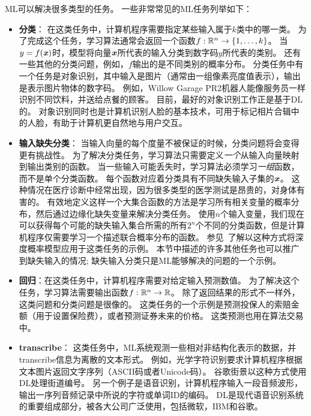 \gls{ML}可以解决很多类型的任务。
一些非常常见的\gls{ML}任务列举如下：
\begin{itemize}
    \item \textbf{分类}：
    在这类任务中，计算机程序需要指定某些输入属于$k$类中的哪一类。
    为了完成这个任务，学习算法通常会返回一个函数$f:\mathbb{R}^n \to \{1,\dots,k\}$。
    当$y=f(\boldsymbol{\mathit{x}})$时，模型将向量$\boldsymbol{\mathit{x}}$所代表的输入分类到数字码$y$所代表的类别。
    还有一些其他的分类问题，例如，$f$输出的是不同类别的概率分布。
    分类任务中有一个任务是对象识别，其中输入是图片（通常由一组像素亮度值表示），输出是表示图片物体的数字码。
    例如，Willow Garage PR2机器人能像服务员一样识别不同饮料，并送给点餐的顾客\citep{Goodfellow2010}。
    目前，最好的对象识别工作正是基于\gls{DL}的\citep{Krizhevsky-2012-small,Ioffe+Szegedy-2015}。
    对象识别同时也是计算机识别人脸的基本技术，可用于标记相片合辑中的人脸\citep{Taigman-et-al-CVPR2014}，有助于计算机更自然地与用户交互。
    
    \item \textbf{输入缺失分类}：
    当输入向量的每个度量不被保证的时候，分类问题将会变得更有挑战性。
    为了解决分类任务，学习算法只需要定义\emph{一个}从输入向量映射到输出类别的函数。
    当一些输入可能丢失时，学习算法必须学习\emph{一组}函数，而不是单个分类函数。
    每个函数对应着分类具有不同缺失输入子集的$\boldsymbol{\mathit{x}}$。
    这种情况在医疗诊断中经常出现，因为很多类型的医学测试是昂贵的，对身体有害的。
    有效地定义这样一个大集合函数的方法是学习所有相关变量的概率分布，然后通过边缘化缺失变量来解决分类任务。 
    使用$n$个输入变量，我们现在可以获得每个可能的缺失输入集合所需的所有$2^n$个不同的分类函数，但是计算机程序仅需要学习一个描述联合概率分布的函数。
    参见~\cite{Goodfellow-et-al-NIPS2013}了解以这种方式将深度概率模型应用于这类任务的示例。 
    本节中描述的许多其他任务也可以推广到缺失输入的情况; 缺失输入分类只是\gls{ML}能够解决的问题的一个示例。
    

    \item \textbf{回归}：在这类任务中，计算机程序需要对给定输入预测数值。
    为了解决这个任务，学习算法需要输出函数$f:\mathbb{R}^n \to \mathbb{R}$。
    除了返回结果的形式不一样外，这类问题和分类问题是很像的。
    这类任务的一个示例是预测投保人的索赔金额（用于设置保险费），或者预测证券未来的价格。
    这类预测也用在算法交易中。
    
    \item \textbf{\gls{transcribe}}：
    这类任务中，\gls{ML}系统观测一些相对非结构化表示的数据，并\gls{transcribe}信息为离散的文本形式。
    例如，光学字符识别要求计算机程序根据文本图片返回文字序列（ASCII码或者Unicode码）。
    谷歌街景以这种方式使用\gls{DL}处理街道编号\citep{Goodfellow+et+al-ICLR2014a}。
    另一个例子是语音识别，计算机程序输入一段音频波形，输出一序列音频记录中所说的字符或单词ID的编码。
    \gls{DL}是现代语音识别系统的重要组成部分，被各大公司广泛使用，包括微软，IBM和谷歌\citep{deepSpeechReviewSPM2012}。


\end{itemize}
